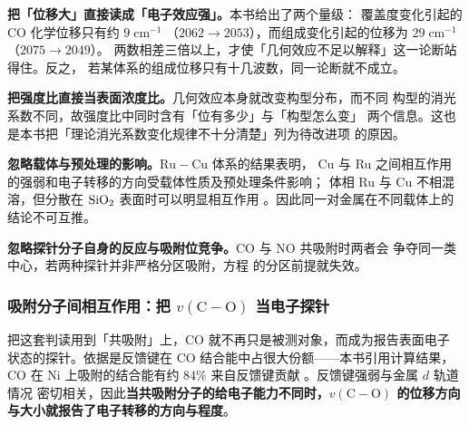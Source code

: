 \begin{pitfall}
\textbf{把「位移大」直接读成「电子效应强」。}本书给出了两个量级：
覆盖度变化引起的 CO 化学位移只有约 $9\;\mathrm{cm^{-1}}$
（$2062\to2053$），而组成变化引起的位移为 $29\;\mathrm{cm^{-1}}$
（$2075\to2049$）。
两数相差三倍以上，才使「几何效应不足以解释」这一论断站得住。反之，
若某体系的组成位移只有十几波数，同一论断就不成立。

\textbf{把强度比直接当表面浓度比。}几何效应本身就改变构型分布，而不同
构型的消光系数不同，故强度比中同时含有「位有多少」与「构型怎么变」
两个信息。这也是本书把「理论消光系数变化规律不十分清楚」列为待改进项
的原因。

\textbf{忽略载体与预处理的影响。}$\mathrm{Ru{-}Cu}$ 体系的结果表明，
Cu 与 Ru 之间相互作用的强弱和电子转移的方向受载体性质及预处理条件影响；
体相 Ru 与 Cu 不相混溶，但分散在 $\ce{SiO2}$ 表面时可以明显相互作用
。因此同一对金属在不同载体上的
结论不可互推。

\textbf{忽略探针分子自身的反应与吸附位竞争。}CO 与 NO 共吸附时两者会
争夺同一类中心，若两种探针并非严格分区吸附，方程
 的分区前提就失效。
\end{pitfall}

\subsubsection{吸附分子间相互作用：把 $v(\mathrm{C{-}O})$ 当电子探针}

\begin{principle}
把这套判读用到「共吸附」上，CO 就不再只是被测对象，而成为报告表面电子
状态的探针。依据是反馈键在 CO 结合能中占很大份额——本书引用计算结果，
CO 在 Ni 上吸附的结合能有约 $84\%$ 来自反馈键贡献
。反馈键强弱与金属 $d$ 轨道情况
密切相关，因此\textbf{当共吸附分子的给电子能力不同时，$v(\mathrm{C{-}O})$
的位移方向与大小就报告了电子转移的方向与程度}。
\end{principle}

